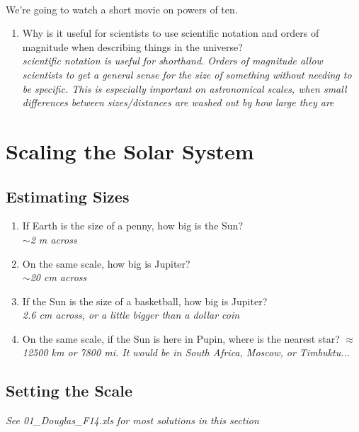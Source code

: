 \documentclass[12pt]{article}%
\begin{document}
\begin{flushleft}
\paragraph{}
We're going to watch a short movie on powers of ten.
\begin{enumerate} 
\item Why is it useful for scientists to use scientific notation and orders of magnitude when describing things in the universe? \\ {\it scientific notation is useful for shorthand. Orders of magnitude allow scientists to get a general sense for the size of something without needing to be specific. This is especially important on astronomical scales, when small differences between sizes/distances are washed out by how large they are}
\end{enumerate}

\section{Scaling the Solar System}

\subsection{Estimating Sizes}

\begin{enumerate}
\item If Earth is the size of a penny, how big is the Sun? \\ {\it $\sim$2 m across}
\item On the same scale, how big is Jupiter? \\ {\it $\sim$20 cm across}
\item If the Sun is the size of a basketball, how big is Jupiter? \\ {\it 2.6 cm across, or a little bigger than a dollar coin}
\item On the same scale, if the Sun is here in Pupin, where is the nearest star? {\it $\approx$12500 km or 7800 mi. It would be in South Africa, Moscow, or Timbuktu...}
\end{enumerate}

\subsection{Setting the Scale}

{ \it {\large See 01\_Douglas\_F14.xls for most solutions in this section }}


\end{flushleft}
\end{document}
